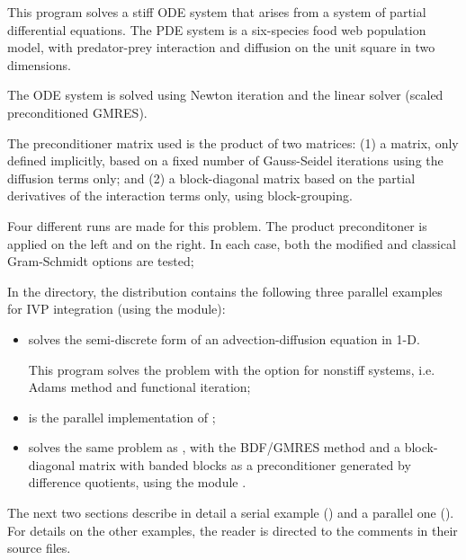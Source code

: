 \begin{itemize}
  This program solves a stiff ODE system that arises from a system     
  of partial differential equations.  The PDE system is a six-species
  food web population model, with predator-prey interaction and diffusion 
  on the unit square in two dimensions.

  The ODE system is solved using Newton iteration and the      
  {\cvspgmr} linear solver (scaled preconditioned GMRES).                  
                                                                        
  The preconditioner matrix used is the product of two matrices:         
  (1) a matrix, only defined implicitly, based on a fixed number of     
  Gauss-Seidel iterations using the diffusion terms only; and               
  (2) a block-diagonal matrix based on the partial derivatives of the   
  interaction terms only, using block-grouping.                          
                                                                        
  Four different runs are made for this problem.                        
  The product preconditoner is applied on the left and on the right.    
  In each case, both the modified and classical Gram-Schmidt options    
  are tested;
\end{itemize}

\noindent In the  directory, the {\cvodes} 
distribution contains the following three parallel examples for
IVP integration (using the {\nvecp} module):
\begin{itemize}
\item {}
  solves the semi-discrete form of an advection-diffusion equation in 1-D.

  This program solves the problem with the option for nonstiff systems,
  i.e. Adams method and functional iteration;
\item {}
  is the parallel implementation of ;
\item {}
  solves the same problem as , with the BDF/GMRES method 
  and a block-diagonal matrix with banded blocks as a preconditioner 
  generated by difference quotients, using the module {\cvbbdpre}.
\end{itemize}

The next two sections describe in detail a serial example () and
a parallel one (). For details on the other examples, the reader is
directed to the comments in their source files.

